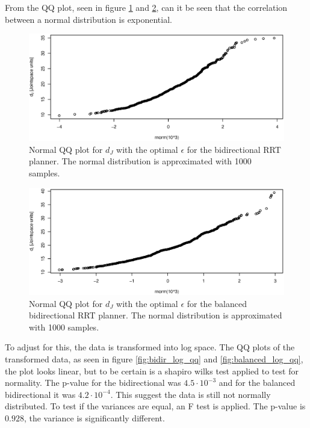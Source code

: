 From the QQ plot, seen in figure \ref{fig:bidir_qq} and \ref{fig:balanced_qq}, can it be seen that the correlation between a normal distribution is exponential.

\begin{figure}[H]
 \centering
 \includegraphics[width=\figsize]{graphics/qq_op_bi}
 \caption{Normal QQ plot for \(d_J\) with the optimal \(\epsilon\) for the bidirectional RRT planner. The normal distribution is approximated with 1000 samples.}
 \label{fig:bidir_qq}
\end{figure}

\begin{figure}[H]
 \centering
 \includegraphics[width=\figsize]{graphics/qq_op_ba}
 \caption{Normal QQ plot for \(d_J\) with the optimal \(\epsilon\) for the balanced bidirectional RRT planner. The normal distribution is approximated with 1000 samples.}
 \label{fig:balanced_qq}
\end{figure}

To adjust for this, the data is transformed into log space.
The QQ plots of the transformed data, as seen in figure \ref{fig:bidir_log_qq} and \ref{fig:balanced_log_qq}, the plot looks linear, 
but to be certain is a shapiro wilks test applied to test for normality.
The p-value for the bidirectional was \(4.5\cdot10^{-3}\) and for the balanced bidirectional it was \(4.2\cdot10^{-4}\).
This suggest the data is still not normally distributed.
To test if the variances are equal, an F test is applied.
The p-value is  \(0.928\), the variance is significantly different.

